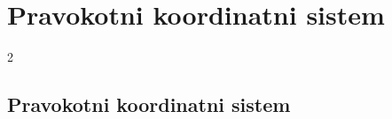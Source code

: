 \section{Pravokotni koordinatni sistem}

\begin{frame}
    \sectionpage
\end{frame}

\begin{frame}
    \begin{multicols}{2}
    \end{multicols}
\end{frame}

    \subsection{Pravokotni koordinatni sistem}

